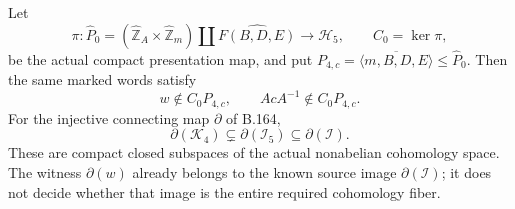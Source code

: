Let
\[
 \pi:\widehat P_0=
 (\widehat{\mathbb Z}_A\times\widehat{\mathbb Z}_m)
       \amalg\widehat{F(B,D,E)}\longrightarrow\mathcal H_5,
 \qquad C_0=\ker\pi,
\]
be the actual compact presentation map, and put
\(P_{4,c}=\overline{\langle m,B,D,E\rangle}\le\widehat P_0\).
Then the same marked words satisfy
\begin{equation}\label{eq:B176-preimage}
 w\notin C_0P_{4,c},\qquad AcA^{-1}\notin C_0P_{4,c}.
\end{equation}
For the injective connecting map \(\partial\) of B.164,
\begin{equation}\label{eq:B176-cohomology}
 \partial(\mathcal K_4)\subsetneq
 \partial(\mathcal I_5)\subseteq\partial(\mathcal I).
\end{equation}
These are compact closed subspaces of the actual nonabelian cohomology
space. The witness \(\partial(w)\) already belongs to the known source
image \(\partial(\mathcal I)\); it does not decide whether that image
is the entire required cohomology fiber.

